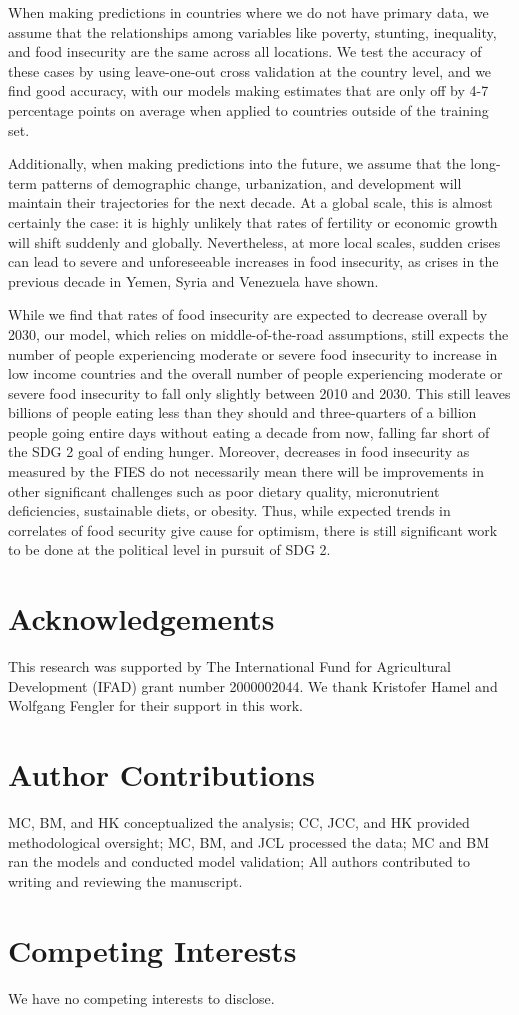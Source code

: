 \documentclass[titlepage]{article}
\begin{document}
When making predictions in countries where we do not have primary data, we assume that the relationships among variables like poverty, stunting, inequality, and food insecurity are the same across all locations.  We test the accuracy of these cases by using leave-one-out cross validation at the country level, and we find good accuracy, with our models making estimates that are only off by 4-7 percentage points on average when applied to countries outside of the training set. 

Additionally, when making predictions into the future, we assume that the long-term patterns of demographic change, urbanization, and development will maintain their trajectories for the next decade.  At a global scale, this is almost certainly the case: it is highly unlikely that rates of fertility or economic growth will shift suddenly and globally.  Nevertheless, at more local scales, sudden crises can lead to severe and unforeseeable increases in food insecurity, as crises in the previous decade in Yemen, Syria and Venezuela have shown.

While we find that rates of food insecurity are expected to decrease overall by 2030, our model, which relies on middle-of-the-road assumptions, still expects the number of people experiencing moderate or severe food insecurity to increase in low income countries and the overall number of people experiencing moderate or severe food insecurity to fall only slightly between 2010 and 2030.  This still leaves billions of people eating less than they should and three-quarters of a billion people going entire days without eating a decade from now, falling far short of the SDG 2 goal of ending hunger.  Moreover, decreases in food insecurity as measured by the FIES do not necessarily mean there will be improvements in other significant challenges such as poor dietary quality, micronutrient deficiencies, sustainable diets, or obesity.  Thus, while expected trends in correlates of food security give cause for optimism, there is still significant work to be done at the political level in pursuit of SDG 2.

\section{Acknowledgements}
This research was supported by The International Fund for Agricultural Development (IFAD) grant number 2000002044.  We thank Kristofer Hamel and Wolfgang Fengler for their support in this work.

\section{Author Contributions}
MC, BM, and HK conceptualized the analysis; CC, JCC, and HK provided methodological oversight; MC, BM, and JCL processed the data; MC and BM ran the models and conducted model validation; All authors contributed to writing and reviewing the manuscript.

\section{Competing Interests}
We have no competing interests to disclose.



\end{document}
